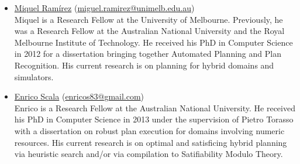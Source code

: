 \documentclass[10pt]{article}
\begin{document}
\begin{itemize}

%
\item \href{http://findanexpert.unimelb.edu.au/display/person778610#tab-overview}{Miquel Ram\'{i}rez}
  (\href{mailto:miguel.ramirez@unimelb.edu.au}{miguel.ramirez@unimelb.edu.au})\\
Miquel is a Research Fellow at the University of Melbourne. Previously, he was
a Research Fellow at the Australian National University and the Royal Melbourne
Institute of Technology. He
received his PhD in Computer Science in 2012 for a dissertation
bringing together Automated Planning and Plan Recognition. His current
research is on planning for hybrid domains and simulators.


\item \href{http://www.hstairs.com/}{Enrico Scala}
(\href{enricos83@gmail.com}{enricos83@gmail.com})\\
Enrico is a Research Fellow at the Australian National University. He
received his PhD in Computer Science in 2013 under the supervision of Pietro Torasso with a dissertation on robust plan execution for domains involving numeric resources. His current research is on optimal and satisficing hybrid planning via heuristic search and/or via compilation to Satifiability Modulo Theory.



\end{itemize}
\end{document}
